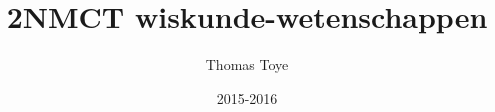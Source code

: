 \documentclass[a4paper,12pt]{book}
\begin{document}
\author{Thomas Toye}
\title{2NMCT wiskunde-wetenschappen}
\date{2015-2016}

\frontmatter
\tableofcontents

\mainmatter



\backmatter
\end{document}
